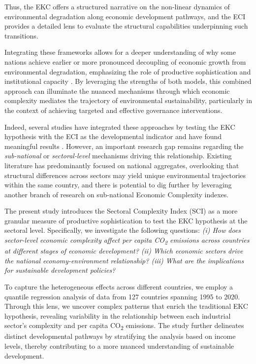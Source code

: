 \documentclass[10pt]{article}
\begin{document}
Thus, the EKC offers a structured narrative on the non-linear dynamics of environmental degradation along economic development pathways, and the ECI provides a detailed lens to evaluate the structural capabilities underpinning such transitions. 

Integrating these frameworks allows for a deeper understanding of why some nations achieve earlier or more pronounced decoupling of economic growth from environmental degradation, emphasizing the role of productive sophistication and institutional capacity \citep{degirmenciDecouplingSustainableDevelopment2024}. By leveraging the strengths of both models, this combined approach can illuminate the nuanced mechanisms through which economic complexity mediates the trajectory of environmental sustainability, particularly in the context of achieving targeted and effective governance interventions. 

Indeed, several studies have integrated these approaches by testing the EKC hypothesis with the ECI as the developmental indicator and have found meaningful results \citep{neaguLinkEconomicComplexity2019, yilanciInvestigatingEKCHypothesis2020}. However, an important research gap remains regarding the \textit{sub-national} or \textit{sectoral-level} mechanisms driving this relationship. Existing literature has predominantly focused on national aggregates, overlooking that structural differences across sectors may yield unique environmental trajectories within the same country, and there is potential to dig further by leveraging another branch of research on sub-national Economic Complexity indexes.

The present study introduces the Sectoral Complexity Index (SCI) as a more granular measure of productive sophistication to test the EKC hypothesis at the sectoral level. Specifically, we investigate the following questions: \textit{(i) How does sector-level economic complexity affect per capita CO\textsubscript{2} emissions across countries at different stages of economic development? (ii) Which economic sectors drive the national economy-environment relationship? (iii) What are the implications for sustainable development policies?} 

To capture the heterogeneous effects across different countries, we employ a quantile regression analysis of data from 127 countries spanning 1995 to 2020. Through this lens, we uncover complex patterns that enrich the traditional EKC hypothesis, revealing variability in the relationship between each industrial sector's complexity and per capita CO\textsubscript{2} emissions. The study further delineates distinct developmental pathways by stratifying the analysis based on income levels, thereby contributing to a more nuanced understanding of sustainable development.
\end{document}
